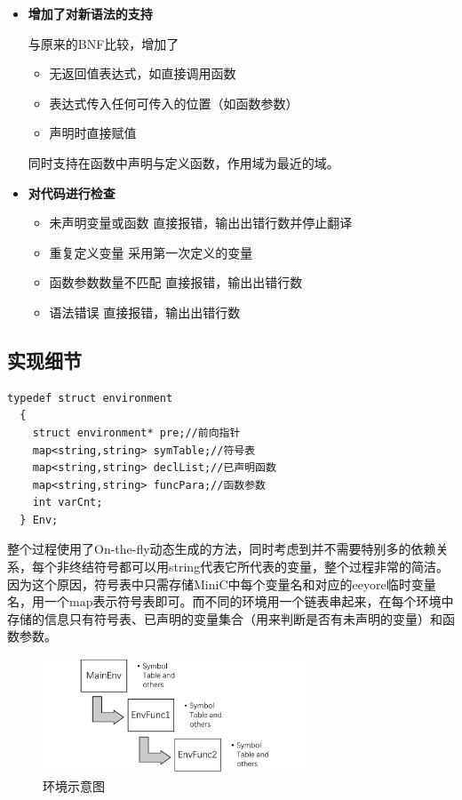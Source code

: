 \documentclass{ctexart}
\begin{document}
\begin{itemize}
  \item \textbf{增加了对新语法的支持}

  与原来的BNF比较，增加了
  \begin{itemize}
    \item 无返回值表达式，如直接调用函数
    \item 表达式传入任何可传入的位置（如函数参数）
    \item 声明时直接赋值
  \end{itemize}

  同时支持在函数中声明与定义函数，作用域为最近的域。

  \item \textbf{对代码进行检查}
  \begin{itemize}
    \item 未声明变量或函数
    直接报错，输出出错行数并停止翻译
    \item 重复定义变量
    采用第一次定义的变量
    \item 函数参数数量不匹配
    直接报错，输出出错行数
    \item 语法错误
    直接报错，输出出错行数
  \end{itemize}

\end{itemize}

\subsection{实现细节}

\begin{lstlisting}[basicstyle=\listingsfont,caption={环境结构},captionpos=b]
typedef struct environment
  {
    struct environment* pre;//前向指针
    map<string,string> symTable;//符号表
    map<string,string> declList;//已声明函数
    map<string,string> funcPara;//函数参数
    int varCnt;
  } Env;
\end{lstlisting}

整个过程使用了On-the-fly动态生成的方法，同时考虑到并不需要特别多的依赖关系，每个非终结符号都可以用string代表它所代表的变量，整个过程非常的简洁。因为这个原因，符号表中只需存储MiniC中每个变量名和对应的eeyore临时变量名，用一个map表示符号表即可。而不同的环境用一个链表串起来，在每个环境中存储的信息只有符号表、已声明的变量集合（用来判断是否有未声明的变量）和函数参数。

\begin{figure}[htbp]
  \centering\includegraphics[width=8cm]{latexIMG/MiniCEnv.png}
  \caption{环境示意图}
  \label{}
\end{figure}
\end{document}
